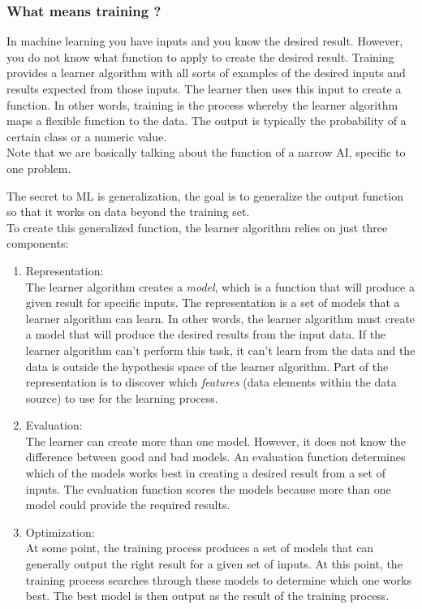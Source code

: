 \subsubsection{What means training ?}
\begin{mybox}{}
	In machine learning you have inputs and you know the desired result. However, you do not know what function to apply to create the desired result. Training provides a learner algorithm with all sorts of examples of the desired inputs and results expected from those inputs. The learner then uses this input to create a function. In other words, training is the process whereby the learner algorithm maps a flexible function to the data. The output is typically the probability of a certain class or a numeric value.\\
	Note that we are basically talking about the function of a narrow AI, specific to one problem.
\end{mybox}
The secret to ML is generalization, the goal is to generalize the output function so that it works on data beyond the training set.\\
To create this generalized function, the learner algorithm relies on just three components:
\begin{enumerate}
	\item Representation:\\
	The learner algorithm creates a \emph{model}, which is a function that will produce a given result for specific inputs. The representation is a set of models that a learner algorithm can learn. In other words, the learner algorithm must create a model that will produce the desired results from the input data. If the learner algorithm can't perform this task, it can't learn from the data and the data is outside the hypothesis space of the learner algorithm. Part of the representation is to discover which \emph{features} (data elements within the data source) to use for the learning process.
	\item Evaluation:\\
	The learner can create more than one model. However, it does not know the difference between good and bad models. An evaluation function determines which of the models works best in creating a desired result from a set of inputs. The evaluation function scores the models because more than one model could provide the required results.
	\item Optimization:\\
	At some point, the training process produces a set of models that can generally output the right result for a given set of inputs. At this point, the training process searches through these models to determine which one works best. The best model is then output as the result of the training process.
\end{enumerate}
